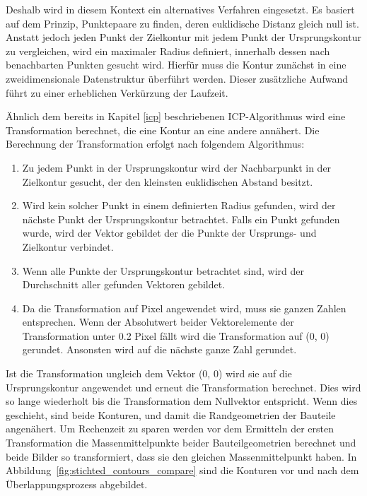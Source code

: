 Deshalb wird in diesem Kontext ein alternatives Verfahren eingesetzt. 
Es basiert auf dem Prinzip, Punktepaare zu finden, deren euklidische
Distanz gleich null ist. Anstatt jedoch jeden Punkt der Zielkontur mit 
jedem Punkt der Ursprungskontur zu vergleichen, wird ein maximaler Radius definiert, 
innerhalb dessen nach benachbarten Punkten gesucht wird. Hierfür muss die Kontur 
zunächst in eine zweidimensionale Datenstruktur überführt werden. Dieser zusätzliche 
Aufwand führt zu einer erheblichen Verkürzung der Laufzeit.

Ähnlich dem bereits in Kapitel \ref{icp} beschriebenen ICP-Algorithmus wird eine Transformation 
berechnet, die eine Kontur an eine andere annähert. Die Berechnung der 
Transformation erfolgt nach folgendem Algorithmus:

\begin{enumerate}
    \item Zu jedem Punkt in der Ursprungskontur wird der Nachbarpunkt
    in der Zielkontur gesucht, der den kleinsten euklidischen Abstand besitzt.
    \item Wird kein solcher Punkt in einem definierten Radius gefunden,
    wird der nächste Punkt der Ursprungskontur
    betrachtet. Falls ein Punkt gefunden wurde, wird der Vektor gebildet der die Punkte
    der Ursprungs- und Zielkontur verbindet.
    \item Wenn alle Punkte der Ursprungskontur betrachtet sind, wird der 
    Durchschnitt aller gefunden Vektoren gebildet.
    \item Da die Transformation auf Pixel angewendet wird, muss sie ganzen Zahlen 
    entsprechen. Wenn der Absolutwert beider Vektorelemente der Transformation 
    unter 0.2 Pixel fällt wird die Transformation auf (0, 0) gerundet.
    Ansonsten wird auf die nächste ganze Zahl gerundet.
\end{enumerate}

Ist die Transformation ungleich dem Vektor (0, 0) wird sie auf die Ursprungskontur 
angewendet und erneut die Transformation berechnet. Dies wird so lange wiederholt bis 
die Transformation dem Nullvektor entspricht. Wenn dies geschieht, sind beide Konturen, 
und damit die Randgeometrien der Bauteile angenähert.
Um Rechenzeit zu sparen werden vor dem Ermitteln der ersten Transformation die 
Massenmittelpunkte beider Bauteilgeometrien berechnet und beide Bilder so transformiert, 
dass sie den gleichen Massenmittelpunkt haben.
In Abbildung~\ref{fig:stichted_contours_compare} sind die Konturen vor und nach 
dem Überlappungsprozess abgebildet.

